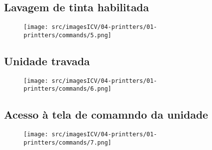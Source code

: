 \newpage
\thispagestyle{fancy}
\vspace*{40 pt}
\subsection{Lavagem de tinta habilitada}
\vspace*{\fill}
\begin{figure}[h]
    \centering
    \texttt{[image: src/imagesICV/04-printters/01-printters/commands/5.png]}
\end{figure}
\vspace*{\fill}

\newpage
\thispagestyle{fancy}
\vspace*{40 pt}
\subsection{Unidade travada}
\vspace*{\fill}
\begin{figure}[h]
    \centering
    \texttt{[image: src/imagesICV/04-printters/01-printters/commands/6.png]}
\end{figure}
\vspace*{\fill}

\newpage
\thispagestyle{fancy}
\vspace*{40 pt}
\subsection{Acesso à tela de comamndo da unidade}
\vspace*{\fill}
\begin{figure}[h]
    \centering
    \texttt{[image: src/imagesICV/04-printters/01-printters/commands/7.png]}
\end{figure}
\vspace*{\fill}


